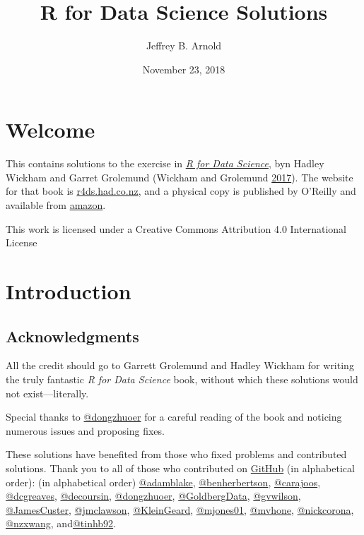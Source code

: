 \documentclass[]{book}
\title{R for Data Science Solutions}
\author{Jeffrey B. Arnold}
\date{November 23, 2018}
\theoremstyle{plain}
\theoremstyle{remark}
\begin{document}
\maketitle

{
\setcounter{tocdepth}{1}
\tableofcontents
}
\hypertarget{welcome}{%
\chapter*{Welcome}\label{welcome}}

This contains solutions to the exercise in
\href{http://amzn.to/2aHLAQ1}{\emph{R for Data Science}}, byn Hadley
Wickham and Garret Grolemund (Wickham and Grolemund
\protect\hyperlink{ref-WickhamGrolemund2017}{2017}). The website for
that book is \href{http://r4ds.had.co.nz/}{r4ds.had.co.nz}, and a
physical copy is published by O'Reilly and available from
\href{http://amzn.to/2aHLAQ1}{amazon}.

This work is licensed under a Creative Commons Attribution 4.0
International License

\hypertarget{introduction}{%
\chapter{Introduction}\label{introduction}}

\hypertarget{acknowledgments}{%
\section*{Acknowledgments}\label{acknowledgments}}

All the credit should go to Garrett Grolemund and Hadley Wickham for
writing the truly fantastic \emph{R for Data Science} book, without
which these solutions would not exist---literally.

Special thanks to \href{https://github.com/dongzhuoer}{@dongzhuoer} for
a careful reading of the book and noticing numerous issues and proposing
fixes.

These solutions have benefited from those who fixed problems and
contributed solutions. Thank you to all of those who contributed on
\href{https://github.com/jrnold/r4ds-exercise-solutions/graphs/contributors}{GitHub}
(in alphabetical order): (in alphabetical order)
\href{https://github.com/adamblake}{@adamblake},
\href{https://github.com/benherbertson}{@benherbertson},
\href{https://github.com/carajoos}{@carajoos},
\href{https://github.com/dcgreaves}{@dcgreaves},
\href{https://github.com/decoursin}{@decoursin},
\href{https://github.com/dongzhuoer}{@dongzhuoer},
\href{https://github.com/GoldbergData}{@GoldbergData},
\href{https://github.com/gvwilson}{@gvwilson},
\href{https://github.com/JamesCuster}{@JamesCuster},
\href{https://github.com/jmclawson}{@jmclawson},
\href{https://github.com/KleinGeard}{@KleinGeard},
\href{https://github.com/mjones01}{@mjones01},
\href{https://github.com/mvhone}{@mvhone},
\href{https://github.com/nickcorona}{@nickcorona},
\href{https://github.com/nzxwang}{@nzxwang},
and\href{https://github.com/tinhb92}{@tinhb92}.
\end{document}
